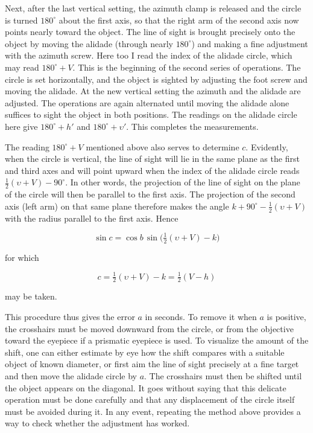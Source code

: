 \par\indent Next, after the last vertical setting, the azimuth clamp is released and the circle is turned $180^\circ$ about the first axis, so that the right arm of the second axis now points nearly toward the object. The line of sight is brought precisely onto the object by moving the alidade (through nearly $180^\circ$) and making a fine adjustment with the azimuth screw. Here too I read the index of the alidade circle, which may read $180^\circ+V$. This is the beginning of the second series of operations. The circle is set horizontally, and the object is sighted by adjusting the foot screw and moving the alidade. At the new vertical setting the azimuth and the alidade are adjusted. The operations are again alternated until moving the alidade alone suffices to sight the object in both positions. The readings on the alidade circle here give $180^\circ+h'$ and $180^\circ+\upsilon'$. This completes the measurements.

\par\indent The reading $180^\circ+V$ mentioned above also serves to determine $c$. Evidently, when the circle is vertical, the line of sight will lie in the same plane as the first and third axes and will point upward when the index of the alidade circle reads $\tfrac{1}{2}(\upsilon+V)-90^\circ$. In other words, the projection of the line of sight on the plane of the circle will then be parallel to the first axis. The projection of the second axis (left arm) on that same plane therefore makes the angle $k+90^\circ-\tfrac{1}{2}(\upsilon+V)$ with the radius parallel to the first axis. Hence

\[ \sin c = \cos b\,\sin\bigl(\tfrac{1}{2}(\upsilon+V)-k\bigr) \]

\noindent for which

\[ c = \tfrac{1}{2}(\upsilon+V)-k = \tfrac{1}{2}(V-h) \]

\noindent may be taken.

\par\indent This procedure thus gives the error $a$ in seconds. To remove it when $a$ is positive, the crosshairs must be moved downward from the circle, or from the objective toward the eyepiece if a prismatic eyepiece is used. To visualize the amount of the shift, one can either estimate by eye how the shift compares with a suitable object of known diameter, or first aim the line of sight precisely at a fine target and then move the alidade circle by $a$. The crosshairs must then be shifted until the object appears on the diagonal. It goes without saying that this delicate operation must be done carefully and that any displacement of the circle itself must be avoided during it. In any event, repeating the method above provides a way to check whether the adjustment has worked.

